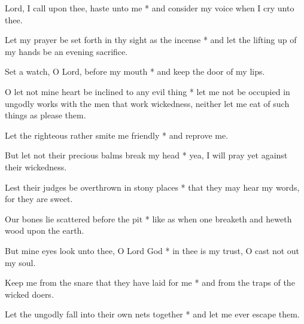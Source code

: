 \begin{multicols}{2}
	
	Lord, I call upon thee, haste unto me * and consider my voice when I cry unto thee.
	
	Let my prayer be set forth in thy sight as the incense * and let the lifting up of my hands be an evening sacrifice.
	
	Set a watch, O Lord, before my mouth * and keep the door of my lips.
	
	O let not mine heart be inclined to any evil thing * let me not be occupied in ungodly works with the men that work wickedness, neither let me eat of such things as please them.
	
	Let the righteous rather smite me friendly * and reprove me.
	
	But let not their precious balms break my head * yea, I will pray yet against their wickedness.
	
	Lest their judges be overthrown in stony places * that they may hear my words, for they are sweet.
	
	Our bones lie scattered before the pit * like as when one breaketh and heweth wood upon the earth.
	
	But mine eyes look unto thee, O Lord God * in thee is my trust, O cast not out my soul.
	
	Keep me from the snare that they have laid for me * and from the traps of the wicked doers.
	
	Let the ungodly fall into their own nets together * and let me ever escape them.
	
	\gloria{}
\end{multicols}